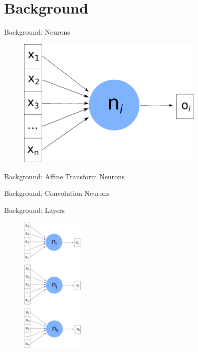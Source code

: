 \documentclass[xcolor=dvipsnames]{beamer}
\begin{document}
\section{Background}

\begin{frame}{Background: Neurons}

\begin{figure}
    \centering
    \includegraphics[width=0.8\textwidth]{images/neuron.pdf}
\end{figure}

\end{frame}


\begin{frame}{Background: Affine Transform Neurons}



\end{frame}

\begin{frame}{Background: Convolution Neurons}
\centering
{}
\end{frame}

\begin{frame}{Background: Layers}

\begin{figure}
    \includegraphics[width=3cm]{images/layer.pdf}
\end{figure}

\end{frame}
\end{document}
